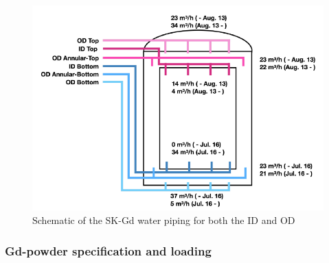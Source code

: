 \begin{figure}[H]
    \includegraphics[width=\textwidth]{Figures/gd_pipes.png}
    \caption{Schematic of the SK-Gd water piping for both the ID and OD}
    \label{fig:gd_pipes}
    \end{figure}


\subsubsection{Gd-powder specification and loading}

